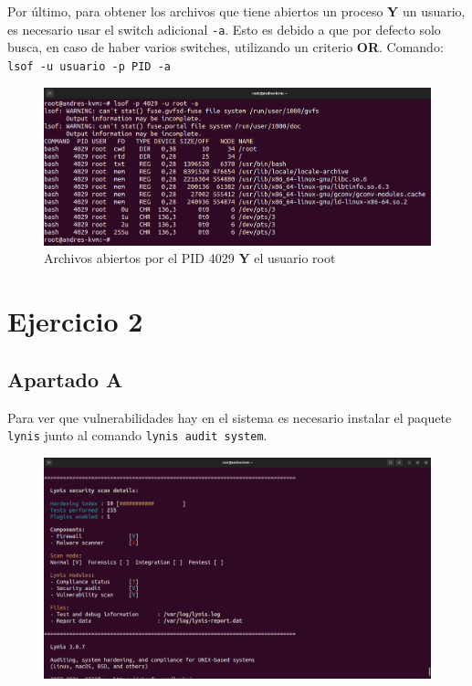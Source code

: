 \documentclass{article}
\begin{document}
\bigskip

Por último, para obtener los archivos que tiene abiertos un proceso \textbf{Y} un usuario, es necesario usar el switch adicional \verb|-a|. Esto es debido a que por defecto solo busca, en caso de haber varios switches, utilizando un criterio \textbf{OR}. Comando: \verb|lsof -u usuario -p PID -a|

\begin{figure}[H]
    \includegraphics[width=\textwidth]{imagenes/lsofand.png}
    \caption{Archivos abiertos por el PID 4029 \textbf{Y} el usuario root}
\end{figure}


\newpage

\section*{Ejercicio 2}
\subsection*{Apartado A}
Para ver que vulnerabilidades hay en el sistema es necesario instalar el paquete \verb|lynis| junto al comando \verb|lynis audit system|.

\begin{figure}[H]
    \includegraphics[width=\textwidth]{imagenes/lynisresults1.png}
\end{figure}
\end{document}
